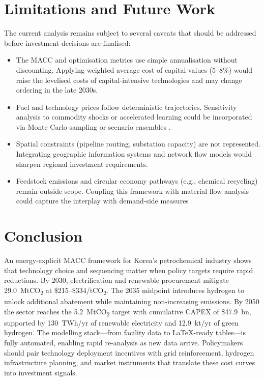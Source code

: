 \documentclass[12pt,a4paper]{article}
\begin{document}
\section{Limitations and Future Work}
\label{sec:limits}

The current analysis remains subject to several caveats that should be addressed before investment decisions are finalised:
\begin{itemize}
    \item The MACC and optimisation metrics use simple annualisation without discounting. Applying weighted average cost of capital values (5--8\%) would raise the levelised costs of capital-intensive technologies and may change ordering in the late 2030s.
    \item Fuel and technology prices follow deterministic trajectories. Sensitivity analysis to commodity shocks or accelerated learning could be incorporated via Monte Carlo sampling or scenario ensembles \citep{Rubin2015}.
    \item Spatial constraints (pipeline routing, substation capacity) are not represented. Integrating geographic information systems and network flow models would sharpen regional investment requirements.
    \item Feedstock emissions and circular economy pathways (e.g., chemical recycling) remain outside scope. Coupling this framework with material flow analysis could capture the interplay with demand-side measures \citep{Jeswani2021}.
\end{itemize}

\section{Conclusion}
\label{sec:conclusion}

An energy-explicit MACC framework for Korea's petrochemical industry shows that technology choice and sequencing matter when policy targets require rapid reductions. By 2030, electrification and renewable procurement mitigate 29.0~MtCO\textsubscript{2} at \$215--\$334/tCO\textsubscript{2}. The 2035 midpoint introduces hydrogen to unlock additional abatement while maintaining non-increasing emissions. By 2050 the sector reaches the 5.2~MtCO\textsubscript{2} target with cumulative CAPEX of \$47.9~bn, supported by 130~TWh/yr of renewable electricity and 12.9~kt/yr of green hydrogen. The modelling stack---from facility data to LaTeX-ready tables---is fully automated, enabling rapid re-analysis as new data arrive. Policymakers should pair technology deployment incentives with grid reinforcement, hydrogen infrastructure planning, and market instruments that translate these cost curves into investment signals.
\end{document}
